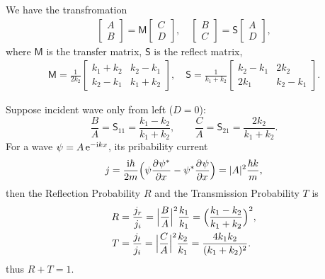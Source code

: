\documentclass{article}
\newcommand*{\op}[1]{\mathsf{#1}}
\begin{document}
We have the transfromation
\begin{align*}
	\begin{bmatrix}A\\B\end{bmatrix}=\op{M}\begin{bmatrix}C\\D\end{bmatrix},\quad
	\begin{bmatrix}B\\C\end{bmatrix}=\op{S}\begin{bmatrix}A\\D\end{bmatrix},
\end{align*}
where $\op{M}$ is the transfer matrix, $\op{S}$ is the reflect matrix,
\begin{align*}
	\op{M}=\frac1{2k_2}\begin{bmatrix}k_1+k_2&k_2-k_1\\k_2-k_1&k_1+k_2\end{bmatrix},\quad
	\op{S}=\frac1{k_1+k_2}\begin{bmatrix}k_2-k_1&2k_2\\2k_1&k_2-k_1\end{bmatrix}.
\end{align*}

Suppose incident wave only from left ($D=0$):
$$\frac BA=\op{S}_{11}=\frac{k_1-k_2}{k_1+k_2},\qquad\frac CA=\op{S}_{21}=\frac{2k_2}{k_1+k_2}.$$
For a wave $\psi=A\mathop{}\!\mathrm{e}^{-\mathrm{i} kx}$, its pribability current
$$j=\frac{\mathrm{i}\hbar}{2m}\Bigl(\psi\frac{\partial^{}\psi^\ast}{\partial{x}^{}}-\psi^\ast\frac{\partial^{}\psi}{\partial{x}^{}}\Bigr)=\lvert A\rvert^2\frac{\hbar k}m,$$
then the Reflection Probability $R$ and the Transmission Probability $T$ is
\begin{align*}
	R & =\frac{j_r}{j_i}=\Bigl\lvert\frac BA\Bigr\rvert^2\frac{k_1}{k_1}=\Bigl(\frac{k_1-k_2}{k_1+k_2}\Bigr)^2, \\
	T & =\frac{j_t}{j_i}=\Bigl\lvert\frac CA\Bigr\rvert^2\frac{k_2}{k_1}=\frac{4k_1k_2}{(k_1+k_2)^2}.
\end{align*}
thus $R+T=1$.
\end{document}
